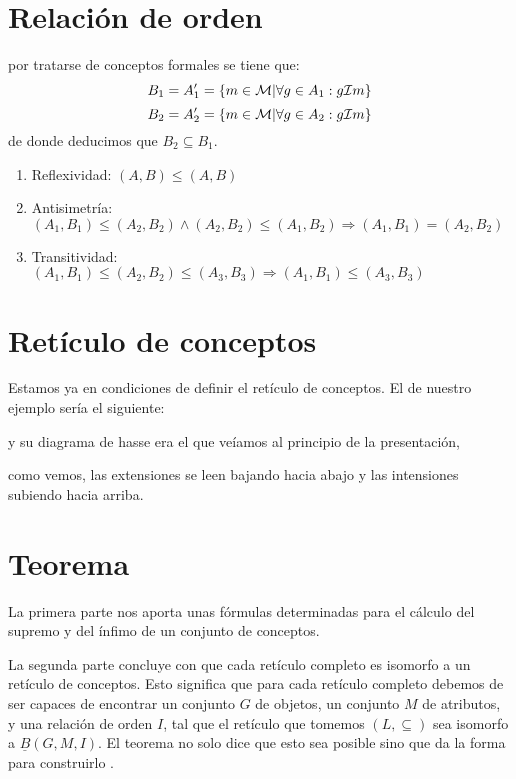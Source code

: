 \documentclass{article}
\begin{document}
\section{Relación de orden}

por tratarse de conceptos formales se tiene que:
$$B_1=A_1'=\{m\in \mathcal{M} | \forall g \in A_1 : g\mathcal{I} m\}$$
$$B_2=A_2'=\{m\in \mathcal{M} | \forall g \in A_2 : g\mathcal{I} m\}$$
de donde deducimos que $B_2 \subseteq B_1$.

\begin{enumerate}
    \item Reflexividad:  $(A,B) \leq (A,B)$
    
    \item Antisimetría: $(A_1,B_1) \leq (A_2,B_2) \wedge (A_2,B_2) \leq (A_1,B_2) \Longrightarrow (A_1,B_1) =(A_2,B_2)$
    
    \item Transitividad: $(A_1,B_1)\leq(A_2,B_2)\leq(A_3,B_3) \Longrightarrow (A_1,B_1) \leq (A_3,B_3)$
\end{enumerate}

\section{Retículo de conceptos}

Estamos ya en condiciones de definir el retículo de conceptos.  El de nuestro ejemplo sería el siguiente:

y su diagrama de hasse era el que veíamos al principio de la presentación,

como vemos, las extensiones se leen bajando hacia abajo y las intensiones subiendo  hacia arriba.


\section{Teorema}

La primera parte nos aporta unas fórmulas determinadas para el cálculo del supremo y del ínfimo de un conjunto de conceptos.

La segunda parte concluye con que cada retículo completo es isomorfo a un retículo de
conceptos. Esto significa que para cada retículo completo debemos de ser capaces de encontrar un conjunto $G$ de objetos, un conjunto $M$ de atributos, y una relación de orden $I$, tal que el retículo que tomemos $(L,\subseteq)$ sea isomorfo a $\underline{{B}}(G,M,I)$. El teorema no solo dice que esto sea posible sino que da la forma para construirlo . 
\end{document}
